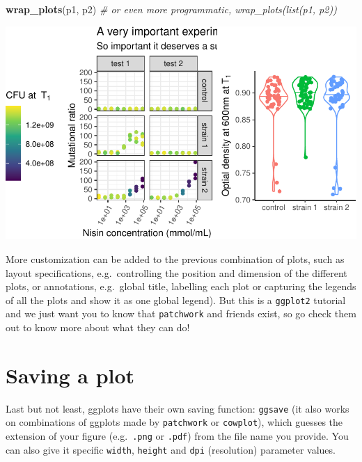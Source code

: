 \documentclass[]{book}
\newenvironment{Shaded}{}{}
\newcommand{\CommentTok}[1]{\textcolor[rgb]{0.38,0.63,0.69}{\textit{#1}}}
\newcommand{\KeywordTok}[1]{\textcolor[rgb]{0.00,0.44,0.13}{\textbf{#1}}}
\newcommand{\NormalTok}[1]{#1}
\begin{document}
\begin{Shaded}
\begin{Highlighting}[]
\KeywordTok{wrap_plots}\NormalTok{(p1, p2) }\CommentTok{# or even more programmatic, wrap_plots(list(p1, p2))}
\end{Highlighting}
\end{Shaded}

\begin{center}\includegraphics[width=\textwidth]{TRES-Tidy-Tutorial_files/figure-latex/unnamed-chunk-152-1} \end{center}

More customization can be added to the previous combination of plots, such as layout specifications, e.g.~controlling the position and dimension of the different plots, or annotations, e.g.~global title, labelling each plot or capturing the legends of all the plots and show it as one global legend). But this is a \texttt{ggplot2} tutorial and we just want you to know that \texttt{patchwork} and friends exist, so go check them out to know more about what they can do!

\hypertarget{saving-a-plot}{%
\section{Saving a plot}\label{saving-a-plot}}

Last but not least, ggplots have their own saving function: \texttt{ggsave} (it also works on combinations of ggplots made by \texttt{patchwork} or \texttt{cowplot}), which guesses the extension of your figure (e.g.~\texttt{.png} or \texttt{.pdf}) from the file name you provide. You can also give it specific \texttt{width}, \texttt{height} and \texttt{dpi} (resolution) parameter values.
\end{document}
